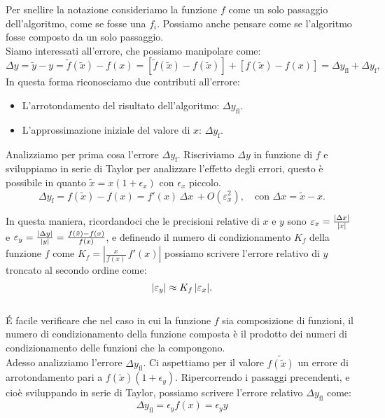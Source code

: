 \documentclass[letterpaper,12pt]{article}
\DeclarePairedDelimiter{\abs}{\lvert}{\rvert} %
\begin{document}
Per snellire la notazione consideriamo la funzione $f$ come un solo passaggio dell'algoritmo, come se fosse una $f_i$. 
Possiamo anche pensare come se l'algoritmo fosse composto da un solo passaggio. \\
Siamo interessati all'errore, che possiamo manipolare come:
\[
\Delta y = \tilde{y} - y = \tilde{f}(\tilde{x}) - f(x) = [\tilde{f}(\tilde{x}) - f(\tilde{x})] + [f(\tilde{x}) - f(x)] = 
 \Delta y_{\operatorname{fl}} + \Delta y_{\operatorname{f}},
\]
In questa forma riconosciamo due contributi all'errore:
\begin{itemize}
    \item L'arrotondamento del risultato dell'algoritmo: $\Delta y_{\operatorname{fl}}$.
    \item L'approssimazione iniziale del valore di $x$: $\Delta y_{\operatorname{f}}$.
\end{itemize}
Analizziamo per prima cosa l'errore $\Delta y_{\operatorname{f}}$. Riscriviamo $\Delta y$ in funzione di $f$ 
e sviluppiamo in serie di Taylor per analizzare l'effetto degli errori, questo è possibile in quanto 
$\tilde{x} = x(1+\epsilon_x)$ con $\epsilon_x$ piccolo.
\[
\Delta y_{\operatorname{f}} = f(\tilde{x}) - f(x) = f'(x)\,\Delta x\, + O(\varepsilon_x^2), \quad \text{con  } 
\Delta x = \tilde{x} - x.
\]

In questa maniera, ricordandoci che le precisioni relative di $x$ e $y$ sono $\varepsilon_x = \frac{\abs{\Delta x}}{\abs{x}}$ e
$\varepsilon_y = \frac{\abs{\Delta y}}{\abs{y}} = \frac{f(\tilde{x}) - f(x)}{f(x)}$, e definendo 
il numero di condizionamento $K_f$ della funzione $f$ come $ K_f = \left|\frac{x}{f(x)}\,f'(x)\right|$ possiamo scrivere 
l'errore relativo di $y$ troncato al secondo ordine come:
\[
\abs{\varepsilon_y} \approx K_f\,\abs{\varepsilon_x}.
\]
\\
É facile verificare che nel caso in cui la funzione $f$ sia composizione di funzioni, il numero di condizionamento
della funzione composta è il prodotto dei numeri di condizionamento delle funzioni che la compongono.\\
Adesso analizziamo l'errore $\Delta y_{\operatorname{fl}}$. Ci aspettiamo per il valore $\tilde{f(\tilde{x})}$ un errore
di arrotondamento pari a $f(\tilde{x})(1+\epsilon_y)$. Ripercorrendo i passaggi precendenti, e cioè sviluppando in serie
di Taylor, possiamo scrivere l'errore relativo $\Delta y_{\operatorname{fl}}$ come:
\[
    \Delta y_{\operatorname{fl}} = \epsilon_y f(x) = \epsilon_y y
\]
\end{document}
